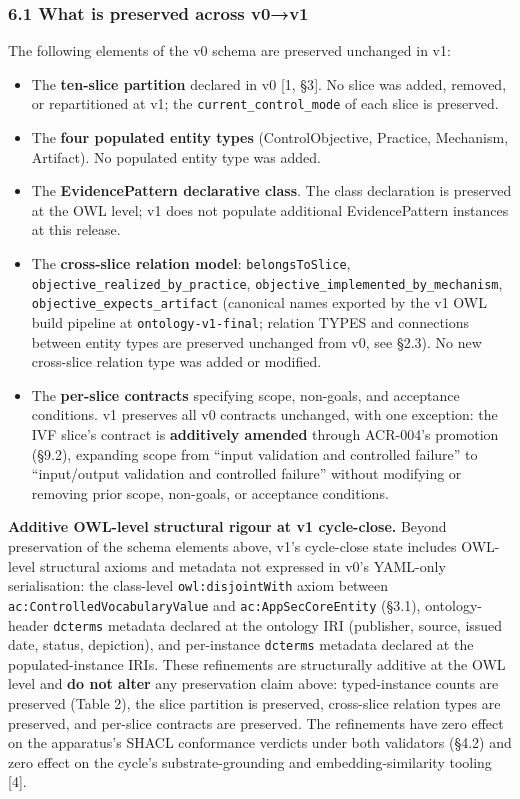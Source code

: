 \documentclass[
]{article}
\providecommand{\tightlist}{%
  \setlength{\itemsep}{0pt}\setlength{\parskip}{0pt}}
\begin{document}
\subsubsection{6.1 What is preserved across
v0→v1}\label{what-is-preserved-across-v0v1}

The following elements of the v0 schema are preserved unchanged in v1:

\begin{itemize}
\tightlist
\item
  The \textbf{ten-slice partition} declared in v0 {[}1, §3{]}. No slice
  was added, removed, or repartitioned at v1; the
  \texttt{current\_control\_mode} of each slice is preserved.
\item
  The \textbf{four populated entity types} (ControlObjective, Practice,
  Mechanism, Artifact). No populated entity type was added.
\item
  The \textbf{EvidencePattern declarative class}. The class declaration
  is preserved at the OWL level; v1 does not populate additional
  EvidencePattern instances at this release.
\item
  The \textbf{cross-slice relation model}: \texttt{belongsToSlice},
  \texttt{objective\_realized\_by\_practice},
  \texttt{objective\_implemented\_by\_mechanism},
  \texttt{objective\_expects\_artifact} (canonical names exported by the
  v1 OWL build pipeline at \texttt{ontology-v1-final}; relation TYPES
  and connections between entity types are preserved unchanged from v0,
  see §2.3). No new cross-slice relation type was added or modified.
\item
  The \textbf{per-slice contracts} specifying scope, non-goals, and
  acceptance conditions. v1 preserves all v0 contracts unchanged, with
  one exception: the IVF slice's contract is \textbf{additively amended}
  through ACR-004's promotion (§9.2), expanding scope from ``input
  validation and controlled failure'' to ``input/output validation and
  controlled failure'' without modifying or removing prior scope,
  non-goals, or acceptance conditions.
\end{itemize}

\textbf{Additive OWL-level structural rigour at v1 cycle-close.} Beyond
preservation of the schema elements above, v1's cycle-close state
includes OWL-level structural axioms and metadata not expressed in v0's
YAML-only serialisation: the class-level \texttt{owl:disjointWith} axiom
between \texttt{ac:ControlledVocabularyValue} and
\texttt{ac:AppSecCoreEntity} (§3.1), ontology-header \texttt{dcterms}
metadata declared at the ontology IRI (publisher, source, issued date,
status, depiction), and per-instance \texttt{dcterms} metadata declared
at the populated-instance IRIs. These refinements are structurally
additive at the OWL level and \textbf{do not alter} any preservation
claim above: typed-instance counts are preserved (Table 2), the slice
partition is preserved, cross-slice relation types are preserved, and
per-slice contracts are preserved. The refinements have zero effect on
the apparatus's SHACL conformance verdicts under both validators (§4.2)
and zero effect on the cycle's substrate-grounding and
embedding-similarity tooling {[}4{]}.
\end{document}
